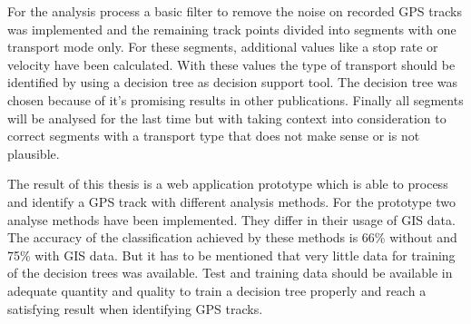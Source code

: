 For the analysis process a basic filter to remove the noise on recorded GPS tracks was implemented and the remaining track points divided into segments with one transport mode only. For these segments, additional values like a stop rate or velocity have been calculated. With these values the type of transport should be identified by using a decision tree as decision support tool. The decision tree was chosen because of it's promising results in other publications. Finally all segments will be analysed for the last time but with taking context into consideration to correct segments with a transport type that does not make sense or is not plausible.

The result of this thesis is a web application prototype which is able to process and identify a GPS track with different analysis methods. For the prototype two analyse methods have been implemented. They differ in their usage of GIS data. The accuracy of the classification achieved by these methods is 66\% without and 75\% with GIS data. But it has to be mentioned that very little data for training of the decision trees was available. Test and training data should be available in adequate quantity and quality to train a decision tree properly and reach a satisfying result when identifying GPS tracks.

\afterpage{\blankpage}
\newpage